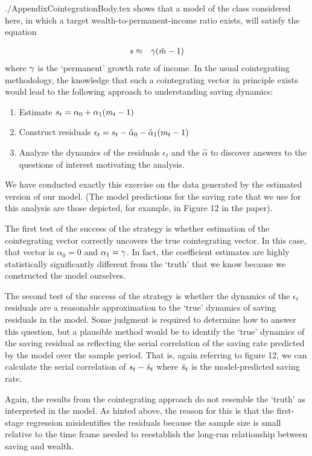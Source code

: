 \documentclass{\econtex}
\begin{document}
\begin{verbatimwrite}{./AppendixCointegrationBody.tex}
\cite{carroll:brookings} shows that a model of the class considered here, in which a 
target wealth-to-permanent-income ratio exists, will satisfy the equation

\begin{eqnarray}
  s & \approx & \gamma (\check{m}-1)
\end{eqnarray}
where $\gamma$ is the `permanent' growth rate of income.  In the usual cointegrating methodology, the knowledge 
that such a cointegrating vector in principle exists would lead to the following approach to
understanding saving dynamics:
\begin{enumerate}
\item Estimate $s_{t} = \alpha_{0} + \alpha_{1} (m_{t}-1)$
\item Construct residuals $\epsilon_{t} = s_{t} - \hat{\alpha}_{0} - \hat{\alpha}_{1} (m_{t}-1)$
\item Analyze the dynamics of the residuals $\epsilon_{t}$ and the $\hat{\alpha}$ to discover answers to the questions 
of interest motivating the analysis.
\end{enumerate}

We have conducted exactly this exercise on the data generated by the estimated version of our model.  (The model predictions for
the saving rate that we use for this analysis are those depicted, for example, in Figure 12 in the paper).  

The first test of the success of the strategy is whether estimation of the cointegrating vector correctly uncovers the 
true cointegrating vector.  In this case, that vector is $\alpha_{0}=0$ and $\alpha_{1} = \gamma$.  In fact, the 
coefficient estimates are highly statistically significantly different from the `truth' that we know because we 
constructed the model ourselves.  %

The second test of the success of the strategy is whether the dynamics of the $\epsilon_{t}$ residuals are a reasonable
approximation to the `true' dynamics of saving residuals in the model.  Some judgment is required to determine how 
to answer this question, but a plausible method would be to identify the `true' dynamics of the saving residual as reflecting the serial 
correlation of the saving rate predicted by the model over the sample period.  That is, again referring to figure 12, 
we can calculate the serial correlation of $s_{t}-\hat{s}_{t}$ where $\hat{s}_{t}$ is the model-predicted saving rate.

Again, the results from the cointegrating approach do not resemble the
`truth' as interpreted in the
model.  %
As hinted above, the reason for this is that the first-stage
regression misidentifies the residuals because the sample size is
small relative to the time frame needed to reestablish the long-run
relationship between saving and wealth.


\end{verbatimwrite}
\end{document}
